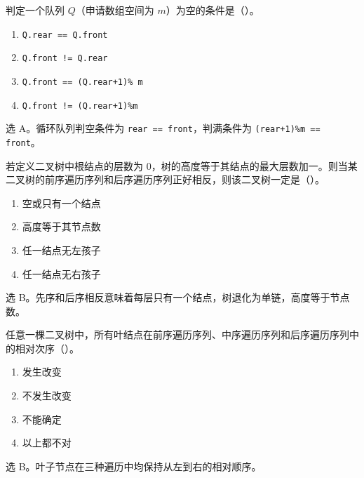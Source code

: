 \begin{question}
判定一个队列 $Q$（申请数组空间为 $m$）为空的条件是（\quad）。
\begin{enumerate}
  \item \texttt{Q.rear == Q.front}
  \item \texttt{Q.front != Q.rear}
  \item \texttt{Q.front == (Q.rear+1)\% m}
  \item \texttt{Q.front != (Q.rear+1)\%m}
\end{enumerate}
\begin{solution}
选 A。循环队列判空条件为 \texttt{rear == front}，判满条件为 \texttt{(rear+1)\%m == front}。
\end{solution}
\end{question}

\begin{question}
若定义二叉树中根结点的层数为 $0$，树的高度等于其结点的最大层数加一。则当某二叉树的前序遍历序列和后序遍历序列正好相反，则该二叉树一定是（\quad）。
\begin{enumerate}
  \item 空或只有一个结点
  \item 高度等于其节点数
  \item 任一结点无左孩子
  \item 任一结点无右孩子
\end{enumerate}
\begin{solution}
选 B。先序和后序相反意味着每层只有一个结点，树退化为单链，高度等于节点数。
\end{solution}
\end{question}

\begin{question}
任意一棵二叉树中，所有叶结点在前序遍历序列、中序遍历序列和后序遍历序列中的相对次序（\quad）。
\begin{enumerate}
  \item 发生改变
  \item 不发生改变
  \item 不能确定
  \item 以上都不对
\end{enumerate}
\begin{solution}
选 B。叶子节点在三种遍历中均保持从左到右的相对顺序。
\end{solution}
\end{question}

